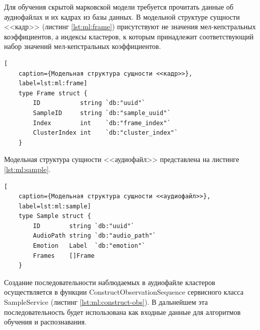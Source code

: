 Для обучения скрытой марковской модели требуется прочитать данные об аудиофайлах и их кадрах из базы данных. В модельной структуре сущности <<кадр>> (листинг \ref{lst:ml:frame}) присутствуют не значения мел-кепстральных коэффициентов, а индексы кластеров, к которым принадлежит соответствующий набор значений мел-кепстральных коэффициентов. 
\begin{lstlisting}[
	caption={Модельная структура сущности <<кадр>>},
	label=lst:ml:frame]
	type Frame struct {
		ID           string `db:"uuid"`
		SampleID     string `db:"sample_uuid"`
		Index        int    `db:"frame_index"`
		ClusterIndex int    `db:"cluster_index"`
	}
\end{lstlisting}
Модельная структура сущности <<аудиофайл>> представлена на листинге \ref{lst:ml:sample}. 
\begin{lstlisting}[
	caption={Модельная структура сущности <<аудиофайл>>},
	label=lst:ml:sample]
	type Sample struct {
		ID        string `db:"uuid"`
		AudioPath string `db:"audio_path"`
		Emotion   Label  `db:"emotion"`
		Frames    []Frame
	}
\end{lstlisting}

Создание последовательности наблюдаемых в аудиофайле кластеров осуществляется в функции ConstructObservationSequence сервисного класса SampleService (листинг \ref{lst:ml:construct-obs}). В дальнейшем эта последовательность будет использована как входные данные для алгоритмов обучения и распознавания.

